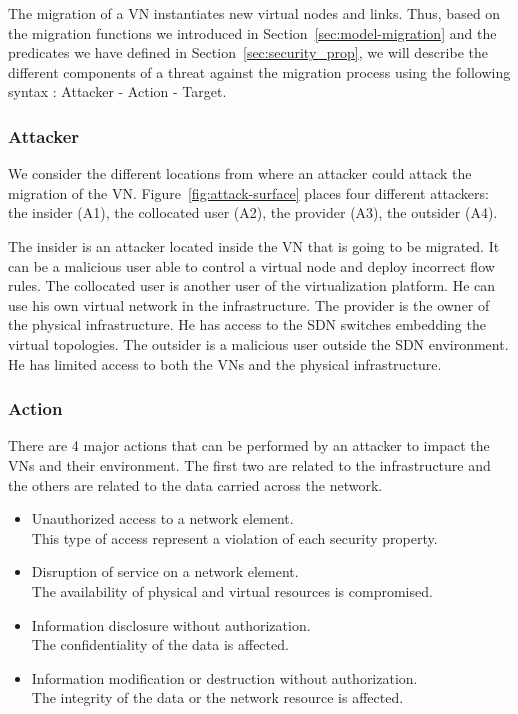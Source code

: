 \label{sec:attacker-model}
The migration of a VN instantiates new virtual nodes and links.
Thus, based on  the migration functions we introduced in Section~\ref{sec:model-migration} and the predicates we have defined in Section~\ref{sec:security_prop}, we will describe the different components of a threat against the migration process using the following syntax
: Attacker - Action - Target.



\subsubsection{Attacker}
We consider the different locations from where an attacker could attack the migration of the VN. 
Figure~\ref{fig:attack-surface} places four different attackers: the insider (A1), the collocated user (A2), the provider (A3), the outsider (A4).

The insider is an attacker located inside the VN that is going to be migrated.
It can be a malicious user able to control a virtual node and deploy incorrect flow rules.
The collocated user is another user of the virtualization platform.
He can use his own virtual network in the infrastructure.
The provider is the owner of the physical infrastructure.
He has access to the SDN switches embedding the virtual topologies.
The outsider is a malicious user outside the SDN environment.
He has limited access to both the VNs and the physical infrastructure.

\subsubsection{Action}
There are 4 major actions that can be performed by an attacker to impact the VNs and their environment.
The first two are related to the infrastructure and the others are related to the data carried across the network.
\begin{itemize}
\item Unauthorized access to a network element.
\\ This type of access represent a violation of each security property.
\item Disruption of service on a network element.
\\ The availability of physical and virtual resources is compromised.
\item Information disclosure without authorization.
\\ The confidentiality of the data is affected.
\item Information modification or destruction without authorization.
\\ The integrity of the data or the network resource is affected.
\end{itemize}

